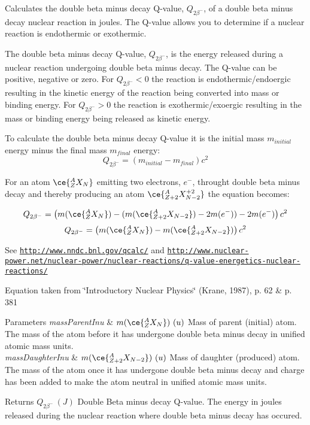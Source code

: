 Calculates the double beta minus decay Q-\/value, $Q_{2\beta^-}$, of a double beta minus decay nuclear reaction in joules. The Q-\/value allows you to determine if a nuclear reaction is endothermic or exothermic. 

The double beta minus decay Q-\/value, $Q_{2\beta^-}$, is the energy released during a nuclear reaction undergoing double beta minus decay. The Q-\/value can be positive, negative or zero. For $Q_{2\beta^-} < 0$ the reaction is endothermic/endoergic resulting in the kinetic energy of the reaction being converted into mass or binding energy. For $Q_{2\beta^-} > 0$ the reaction is exothermic/exoergic resulting in the mass or binding energy being released as kinetic energy.

To calculate the double beta minus decay Q-\/value it is the initial mass $m_{initial}$ energy minus the final mass $m_{final}$ energy\+: \[Q_{2\beta^-} = \left ( m_{initial}-m_{final}\right ) c^2\]

For an atom $\ce{ ^{A}_{Z}X_{N} }$ emitting two electrons, $e^-$, throught double beta minus decay and thereby producing an atom $\ce{ ^{A}_{Z{+2}}X^{+2}_{N-2} }$ the equation becomes\+:

\[Q_{2\beta^-} = \left ( m(\ce{ ^{A}_{Z}X_{N} }) - (m(\ce{ ^{A}_{Z{+2}}X_{N-2} }) - 2m(e^-)) - 2m(e^-)\right ) c^2\] \[Q_{2\beta^-} = \left ( m(\ce{ ^{A}_{Z}X_{N} }) - m(\ce{ ^{A}_{Z{+2}}X_{N-2} })\right ) c^2\]

See \href{http://www.nndc.bnl.gov/qcalc/}{\tt http\+://www.\+nndc.\+bnl.\+gov/qcalc/} and \href{http://www.nuclear-power.net/nuclear-power/nuclear-reactions/q-value-energetics-nuclear-reactions/}{\tt http\+://www.\+nuclear-\/power.\+net/nuclear-\/power/nuclear-\/reactions/q-\/value-\/energetics-\/nuclear-\/reactions/}

Equation taken from \char`\"{}\+Introductory Nuclear Physics\char`\"{} (Krane, 1987), p. 62 \& p. 381


\begin{DoxyParams}{Parameters}
{\em mass\+Parent\+Inu} & $m(\ce{ ^{A}_{Z}X_{N} })\ (u)$ Mass of parent (initial) atom. The mass of the atom before it has undergone double beta minus decay in unified atomic mass units. \\
\hline
{\em mass\+Daughter\+Inu} & $m(\ce{ ^{A}_{Z{+2}}X_{N-2} })\ (u)$ Mass of daughter (produced) atom. The mass of the atom once it has undergone double beta minus decay and charge has been added to make the atom neutral in unified atomic mass units. \\
\hline
\end{DoxyParams}
\begin{DoxyReturn}{Returns}
$Q_{2\beta^-}\ (J)$ Double Beta minus decay Q-\/value. The energy in joules released during the nuclear reaction where double beta minus decay has occured. 
\end{DoxyReturn}
\mbox{\label{group___q_value_ga0eefdd84aa89d210e00dca043368dfeb}} 

